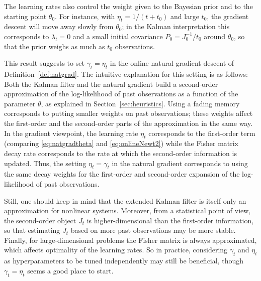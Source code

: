 \documentclass[11pt,a4paper]{article}
\renewcommand{\geq}{\geqslant}
\newcommand{\1}{\mathbbm{1}}
\theoremstyle{yannthm}
\theoremstyle{yannthm2}
\numberwithin{equation}{section}
\begin{document}
The learning rates also control the weight given to the Bayesian prior
and to the starting point $\theta_0$. For instance, with
$\eta_t=1/(t+t_0)$ and large $t_0$, the gradient descent will move away slowly from
$\theta_0$; in the Kalman interpretation this
corresponds to $\lambda_t=0$ and a small initial covariance
$P_0=J_0^{-1}/t_0$ around $\theta_0$, so that the prior weighs
as much as $t_0$ observations.

This result suggests to set $\gamma_t=\eta_t$ in the online natural
gradient descent of Definition~\ref{def:natgrad}. The intuitive
explanation for this setting is as follows: Both the Kalman filter and
the natural gradient build a second-order approximation of the
log-likelihood of past observations as a function of the parameter
$\theta$, as explained in Section~\ref{sec:heuristics}. Using a fading
memory corresponds to putting smaller weights on past observations; these
weights affect the first-order and the second-order parts of the
approximation in the same way. In the gradient viewpoint, the learning
rate $\eta_t$ corresponds to the first-order term (comparing
\eqref{eq:natgradtheta} and \eqref{eq:onlineNewt2}) while the Fisher matrix
decay rate corresponds to the rate at which the second-order information
is updated. Thus, the setting $\eta_t=\gamma_t$ in
the natural gradient corresponds to using the same decay weights for the
first-order and second-order expansion of the log-likelihood of past
observations.

Still, one should keep in mind that the extended Kalman filter is itself
only an approximation for nonlinear systems. Moreover, from a statistical
point of view, the second-order object $J_t$ is higher-dimensional than
the first-order information, so that estimating $J_t$ based on more past
observations may be more stable. Finally, for large-dimensional problems
the Fisher matrix is always approximated, which affects optimality of the
learning rates. So in practice, considering
$\gamma_t$ and $\eta_t$ as hyperparameters to be tuned independently may
still be beneficial, though $\gamma_t=\eta_t$ seems a good place to
start.
\end{document}
